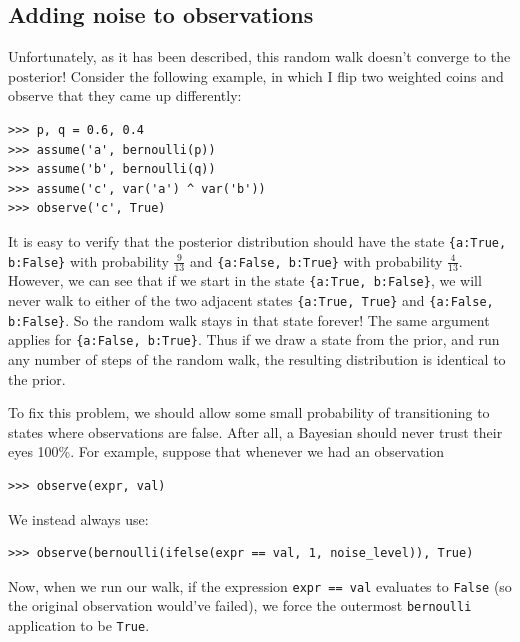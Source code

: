 \documentclass[11pt]{article}
\begin{document}
\subsection{Adding noise to observations}

Unfortunately, as it has been described, this random walk doesn't converge to the posterior!  Consider the following example, in which I flip two weighted coins and observe that they came up differently:  

\begin{small}
\begin{verbatim}
>>> p, q = 0.6, 0.4
>>> assume('a', bernoulli(p))
>>> assume('b', bernoulli(q))
>>> assume('c', var('a') ^ var('b'))
>>> observe('c', True)
\end{verbatim}
\end{small}

It is easy to verify that the posterior distribution should have the state {\tt \{a:True, b:False\}} with probability $\frac{9}{13}$ and {\tt \{a:False, b:True\}} with probability $\frac{4}{13}$.  However, we can see that if we start in the state {\tt \{a:True, b:False\}}, we will never walk to either of the two adjacent states {\tt \{a:True, True\}} and {\tt \{a:False, b:False\}}.  So the random walk stays in that state forever!  The same argument applies for {\tt \{a:False, b:True\}}.  Thus if we draw a state from the prior, and run any number of steps of the random walk, the resulting distribution is identical to the prior.  \vspace{6 pt}

To fix this problem, we should allow some small probability of transitioning to states where observations are false.  After all, a Bayesian should never trust their eyes 100\%.  For example, suppose that whenever we had an observation

\begin{small}
\begin{verbatim}
>>> observe(expr, val)
\end{verbatim}
\end{small}

We instead always use:

\begin{small}
\begin{verbatim}
>>> observe(bernoulli(ifelse(expr == val, 1, noise_level)), True)
\end{verbatim}
\end{small}

Now, when we run our walk, if the expression {\tt expr == val} evaluates to {\tt False} (so the original observation would've failed), we force the outermost {\tt bernoulli} application to be {\tt True}.  
\end{document}
